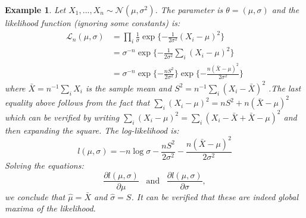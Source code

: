 \documentclass[twoside]{article}
\newcounter{lecnum}
\newtheorem{example}{Example}[lecnum]
\begin{document}
\begin{example}
Let $X_1,...,X_n \sim \mathcal{N}(\mu, \sigma^2)$. The parameter is $\theta = (\mu, \sigma)$ and the likelihood function (ignoring some constants) is:
\begin{equation*}
\begin{aligned}
    \mathcal{L}_n(\mu, \sigma) &= \prod\limits_{i}\frac{1}{\sigma}\exp{\{-\frac{1}{2\sigma^2}(X_i - \mu)^2\}}\\
    &= \sigma^{-n}\exp{\{-\frac{1}{2\sigma^2}\sum\limits_i(X_i - \mu)^2\}}\\
    &= \sigma^{-n}\exp{\{-\frac{nS^2}{2\sigma^2}\}}\exp{\{-\frac{n(\bar{X} - \mu)^2}{2\sigma^2}\}}
\end{aligned}
\end{equation*}
where $\bar{X} = n^{-1}\sum\limits_i X_i$ is the sample mean and $S^2 = n^{-1}\sum\limits_i(X_i - \bar{X})^2$ .The
last equality above follows from the fact that $\sum\limits_i(X_i - \mu)^2 = nS^2 + n(\bar{X} - \mu)^2$
which can be verified by writing $\sum\limits_i(X_i - \mu)^2 = \sum\limits_i(X_i - \bar{X} + \bar{X} -\mu)^2$ and then expanding the square. The log-likelihood is:
\begin{equation*}
    l(\mu, \sigma) = -n\log\sigma - \frac{nS^2}{2\sigma^2} - \frac{n(\bar{X} - \mu)^2}{2\sigma^2}
\end{equation*}
Solving the equations:
\begin{equation*}
\frac{\partial l(\mu, \sigma)}{\partial\mu} \hspace{10pt} \text{and} \hspace{10pt} \frac{\partial l(\mu, \sigma)}{\partial\sigma},
\end{equation*}
we conclude that $\hat{\mu} = \bar{X}$ and $\hat{\sigma} = S$. It can be verified that these are indeed global maxima of the likelihood.
\end{example}
\end{document}

